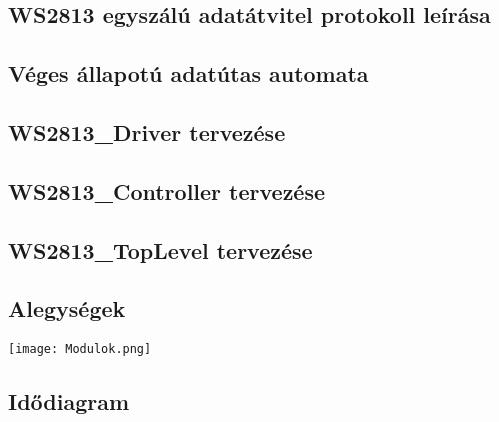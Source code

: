 \subsection{WS2813 egyszálú adatátvitel protokoll leírása}


\subsection{Véges állapotú adatútas automata}


\subsection{WS2813\_Driver tervezése}


\subsection{WS2813\_Controller tervezése}


\subsection{WS2813\_TopLevel tervezése}


\subsection{Alegységek}
\texttt{[image: Modulok.png]}

\subsection{Idődiagram}
